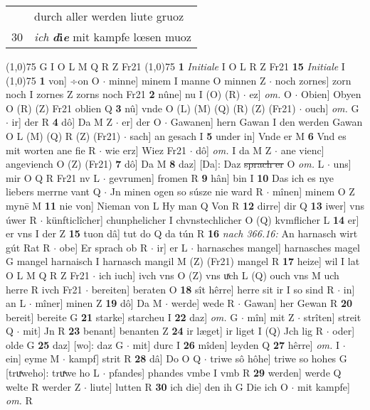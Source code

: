 \documentclass[8pt,a4paper,notitlepage]{article}
\begin{document}
\begin{table}[ht]
\begin{minipage}[t]{0.5\linewidth}
\begin{tabular}{rl}
 & durch aller werden liute gruoz\\ 
30 & \textit{ich} \textbf{\textit{d}i\textit{e}} mit kampfe lœsen muoz\\ 
\end{tabular}
\scriptsize
\line(1,0){75} \newline
G I O L M Q R Z Fr21 \newline
\line(1,0){75} \newline
\textbf{1} \textit{Initiale} I O L R Z Fr21  \textbf{15} \textit{Initiale} I  \newline
\line(1,0){75} \newline
\textbf{1} von] ÷on O  $\cdot$ minne] minem I manne O minnen Z  $\cdot$ noch zornes] zorn noch I zornes Z zorns noch Fr21 \textbf{2} nûne] nu I (O) (R)  $\cdot$ ez] \textit{om.} O  $\cdot$ Obien] Obyen O (R) (Z) Fr21 oblien Q \textbf{3} nû] vnde O (L) (M) (Q) (R) (Z) (Fr21)  $\cdot$ ouch] \textit{om.} G  $\cdot$ ir] der R \textbf{4} dô] Da M Z  $\cdot$ er] der O  $\cdot$ Gawanen] hern Gawan I den werden Gawan O L (M) (Q) R (Z) (Fr21)  $\cdot$ sach] an gesach I \textbf{5} under in] Vnde er M \textbf{6} Vnd es mit worten ane fie R  $\cdot$ wie erz] Wiez Fr21  $\cdot$ dô] \textit{om.} I da M Z  $\cdot$ ane vienc] angeviench O (Z) (Fr21) \textbf{7} dô] Da M \textbf{8} daz] [Da]: Daz \sout{sprach er} O \textit{om.} L  $\cdot$ uns] mir O Q R Fr21 nv L  $\cdot$ gevrumen] fromen R \textbf{9} hân] bin I \textbf{10} Das ich es nye liebers merrne vant Q  $\cdot$ Jn minen ogen so súsze nie ward R  $\cdot$ mînen] minem O Z mynē M \textbf{11} nie von] Nieman von L Hy man Q Von R \textbf{12} dirre] dir Q \textbf{13} iwer] vns úwer R  $\cdot$ künfticlîcher] chunphelicher I chvnstechlicher O (Q) kvmflicher L \textbf{14} er] er vns I der Z \textbf{15} tuon dâ] tut do Q da tún R \textbf{16} \textit{nach 366.16:} An harnasch wirt gút Rat R   $\cdot$ obe] Er sprach ob R  $\cdot$ ir] er L  $\cdot$ harnasches mangel] harnasches magel G mangel harnaisch I harnasch mangil M (Z) (Fr21) mangel R \textbf{17} heize] wil I lat O L M Q R Z Fr21  $\cdot$ ich iuch] ivch vns O (Z) vns uͯch L (Q) ouch vns M uch herre R ivch Fr21  $\cdot$ bereiten] beraten O \textbf{18} sît hêrre] herre sit ir I so sind R  $\cdot$ in] an L  $\cdot$ mîner] minen Z \textbf{19} dô] Da M  $\cdot$ werde] wede R  $\cdot$ Gawan] her Gewan R \textbf{20} bereit] bereite G \textbf{21} starke] starcheu I \textbf{22} daz] \textit{om.} G  $\cdot$ mîn] mit Z  $\cdot$ strîten] streit Q  $\cdot$ mit] Jn R \textbf{23} benant] benanten Z \textbf{24} ir læget] ir liget I (Q) Jch lig R  $\cdot$ oder] olde G \textbf{25} daz] [wo]: daz G  $\cdot$ mit] durc I \textbf{26} mîden] leyden Q \textbf{27} hêrre] \textit{om.} I  $\cdot$ ein] eyme M  $\cdot$ kampf] strit R \textbf{28} dâ] Do O Q  $\cdot$ triwe sô hôhe] triwe so hohes G [truͯweho]: truͯwe ho L  $\cdot$ pfandes] phandes vmbe I vmb R \textbf{29} werden] werde Q welte R werder Z  $\cdot$ liute] lutten R \textbf{30} ich die] den ih G Die ich O  $\cdot$ mit kampfe] \textit{om.} R \newline

\end{minipage}
\end{table}
\end{document}
